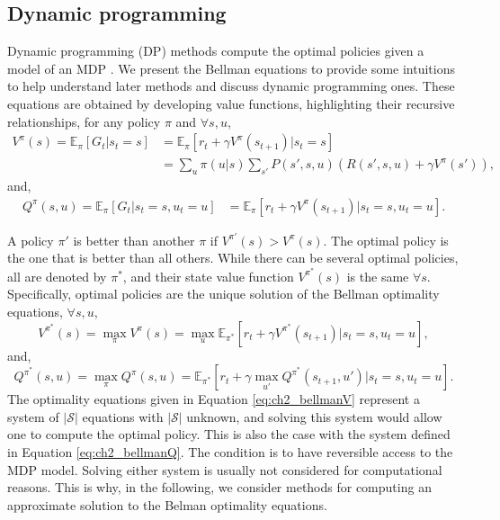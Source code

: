 \subsection{Dynamic programming}
Dynamic programming (DP) \citep{bellman1966dynamic} methods compute the optimal policies given a model of an MDP \citep{sutton2018reinforcement}.
We present the Bellman equations to provide some intuitions to help understand later methods and discuss dynamic programming ones.
These equations are obtained by developing value functions, highlighting their recursive relationships, for any policy $\pi$ and $\forall s, u$,
\begin{equation}
\label{eq:ch2_V_2}
\begin{split}
    V^\pi(s)= \mathbb{E}_{\pi}\left[G_t|s_t=s\right] & = \mathbb{E}_{\pi}\left[r_t + \gamma V^\pi(s_{t+1})|s_t=s\right] \\  &= \sum_{u} \pi(u|s) \sum_{s'} P(s', s, u) (R(s', s, u) + \gamma V^\pi(s')),
\end{split}
\end{equation}
and,
\begin{equation}
\label{eq:ch2_Q_2}
\begin{split}
    Q^\pi(s, u) = \mathbb{E}_{\pi}\left[G_t|s_t=s, u_t=u\right] & = \mathbb{E}_{\pi}\left[r_t + \gamma V^\pi(s_{t+1})|s_t=s, u_t=u \right].
\end{split}
\end{equation}

A policy $\pi'$ is better than another $\pi$ if $V^{\pi'}(s)>V^\pi(s)$.
The optimal policy is the one that is better than all others.
While there can be several optimal policies, all are denoted by $\pi^*$, and their state value function $V^{\pi^*}(s)$ is the same $\forall s$.
Specifically, optimal policies are the unique solution of the Bellman optimality equations, $\forall s, u$,
\begin{equation}
\label{eq:ch2_bellmanV}
    V^{\pi^*}(s) = \max_{\pi}V^\pi(s) = \max_u \mathbb{E}_{\pi^*}[r_t + \gamma V^{\pi^*}(s_{t+1})| s_t=s, u_t=u],
\end{equation}
and,
\begin{equation}
\label{eq:ch2_bellmanQ}
    Q^{\pi^*}(s, u) =  \max_{\pi}Q^\pi(s, u) = \mathbb{E}_{\pi^*}[r_t + \gamma \max_{u'} Q^{\pi^*}(s_{t+1}, u') |s_t=s, u_t=u].
\end{equation}
The optimality equations given in Equation \ref{eq:ch2_bellmanV} represent a system of $|\mathcal{S}|$ equations with $|\mathcal{S}|$ unknown, and solving this system would allow one to compute the optimal policy.
This is also the case with the system defined in Equation \ref{eq:ch2_bellmanQ}.
The condition is to have reversible access to the MDP model.
Solving either system is usually not considered for computational reasons.
This is why, in the following, we consider methods for computing an approximate solution to the Belman optimality equations.

